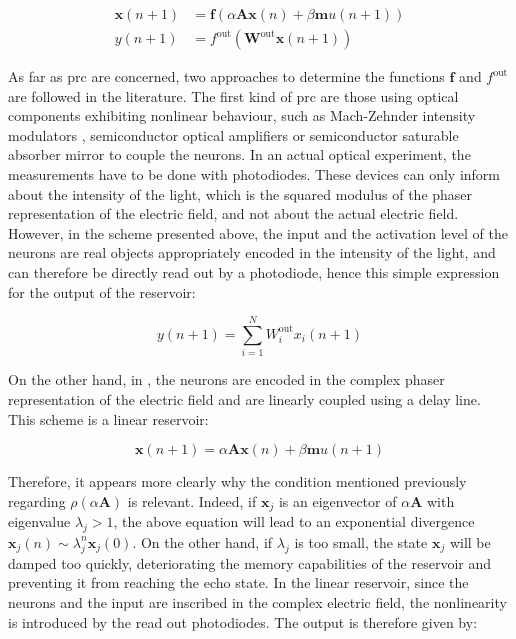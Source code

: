 \begin{align}
	\mathbf{x}(n+1) &= \mathbf{f} \left( \alpha \mathbf{A} \mathbf{x}(n) + \beta \mathbf{m} u(n+1) \right)\\
	y(n+1) &= f^{\text{out}} \left( \mathbf{W}^{\text{out}} \mathbf{x}(n+1) \right)
\end{align}

As far as \gls{prc} are concerned, two approaches to determine the functions $\mathbf{f}$ and $f^{\text{out}}$ are followed in the literature. The first kind of \gls{prc} are those using optical components exhibiting nonlinear behaviour, such as Mach-Zehnder intensity modulators \cite{Duport2016, Paquot2012, Antonik2017}, semiconductor optical amplifiers \cite{Vandoorne2008} or semiconductor saturable absorber mirror \cite{Dejonckheere2014} to couple the neurons. In an actual optical experiment, the measurements have to be done with photodiodes. These devices can only inform about the intensity of the light, which is the squared modulus of the phaser representation of the electric field, and not about the actual electric field. However, in the scheme presented above, the input and the activation level of the neurons are real objects appropriately encoded in the intensity of the light, and can therefore be directly read out by a photodiode, hence this simple expression for the output of the reservoir:

\begin{equation}
	y(n+1) = \sum_{i=1}^{N} W^{\text{out}}_i x_i (n+1)
	\label{lin_output_rc}
\end{equation}

On the other hand, in \cite{Vinckier2015}, the neurons are encoded in the complex phaser representation of the electric field and are linearly coupled using a delay line. This scheme is a linear reservoir:

\begin{equation}
	\mathbf{x}(n+1) = \alpha \mathbf{A} \mathbf{x}(n) + \beta \mathbf{m} u(n+1)
	\label{rc_lin_dynamics}
\end{equation}

Therefore, it appears more clearly why the condition mentioned previously regarding $\rho \left( \alpha \mathbf{A} \right)$ is relevant. Indeed, if $\mathbf{x}_j$ is an eigenvector of $\alpha \mathbf{A}$ with eigenvalue $\lambda_j>1$, the above equation will lead to an exponential divergence $\mathbf{x}_j(n) \sim \lambda_j^n \mathbf{x}_j(0)$. On the other hand, if $\lambda_j$ is too small, the state $\mathbf{x}_j$ will be damped too quickly, deteriorating the memory capabilities of the reservoir and preventing it from reaching the echo state. In the linear reservoir, since the neurons and the input are inscribed in the complex electric field, the nonlinearity is introduced by the read out photodiodes. The output is therefore given by:

